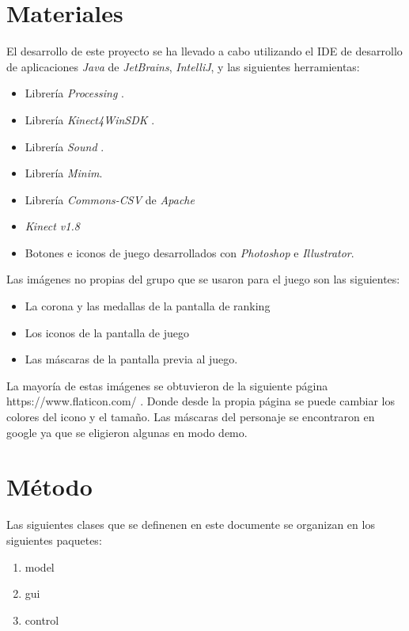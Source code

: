 \documentclass[10pt,a4paper]{report}
\begin{document}
	\section{Materiales}
	El desarrollo de este proyecto se ha llevado a cabo utilizando el IDE de desarrollo de aplicaciones \textit{Java} de \textit{JetBrains}, \textit{IntelliJ}, y las siguientes herramientas:
	\begin{itemize}
		\item Librería \textit{Processing} \cite{processing-javadoc}.
		\item Librería \textit{Kinect4WinSDK} \cite{kinect4winsdk}.
		\item Librería \textit{Sound} \cite{sound-library}.
		\item Librería \textit{Minim}.
		\item Librería \textit{Commons-CSV} de \textit{Apache}
		\item \textit{Kinect v1.8} \cite{control.kinect-sdk}
		\item Botones e iconos de juego desarrollados con \textit{Photoshop} e \textit{Illustrator}.
	\end{itemize}
	
	Las imágenes no propias del grupo que se usaron para el juego son las siguientes: 
	\begin{itemize}
	\item La corona y las medallas de la pantalla de ranking
	\item Los iconos de la pantalla de juego
	\item Las máscaras de la pantalla previa al juego.
	\end{itemize}

La mayoría de estas imágenes se obtuvieron de la siguiente página https://www.flaticon.com/ \cite{imagenes-no-originales}.  Donde desde la propia página se puede cambiar los colores del icono y el tamaño.
Las máscaras del personaje se encontraron en google ya que se eligieron algunas en modo demo. 

	
	\section{Método}
	Las siguientes clases que se definenen en este documente se organizan en los siguientes paquetes:
	\begin{enumerate}
		\item model
		\item gui
		\item control
	\end{enumerate}
\end{document}
